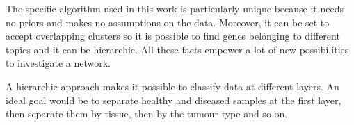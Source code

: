 The specific algorithm used in this work is particularly unique because it needs no priors and makes no assumptions on the data. Moreover, it can be set to accept overlapping clusters so it is possible to find genes belonging to different topics and it can be hierarchic. All these facts empower a lot of new possibilities to investigate a network.

A hierarchic approach makes it possible to classify data at different layers. An ideal goal would be to separate healthy and diseased samples at the first layer, then separate them by tissue, then by the tumour type and so on.
